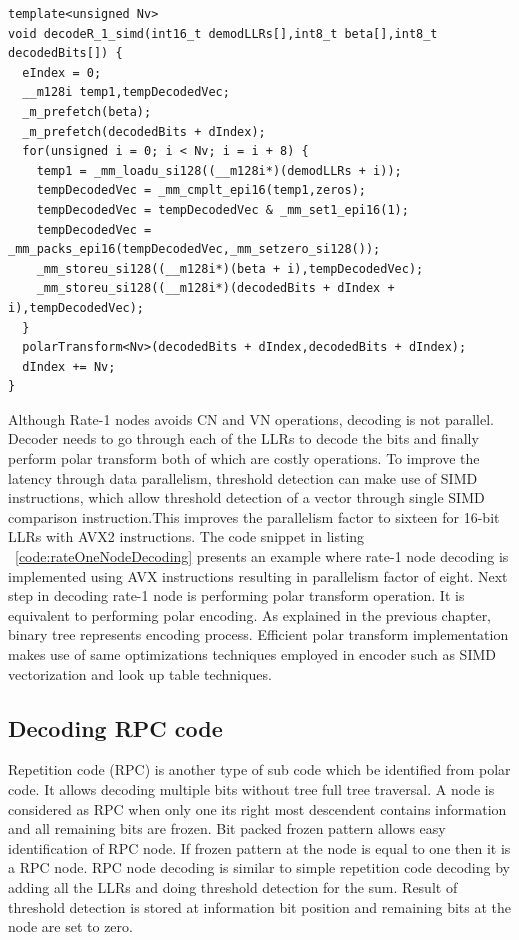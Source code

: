 \begin{code}
	\label{code:rateOneNodeDecoding}
	\begin{verbatim}
template<unsigned Nv>
void decodeR_1_simd(int16_t demodLLRs[],int8_t beta[],int8_t decodedBits[]) {
  eIndex = 0;
  __m128i temp1,tempDecodedVec;
  _m_prefetch(beta);
  _m_prefetch(decodedBits + dIndex);
  for(unsigned i = 0; i < Nv; i = i + 8) {
    temp1 = _mm_loadu_si128((__m128i*)(demodLLRs + i));
    tempDecodedVec = _mm_cmplt_epi16(temp1,zeros);
    tempDecodedVec = tempDecodedVec & _mm_set1_epi16(1);
    tempDecodedVec = _mm_packs_epi16(tempDecodedVec,_mm_setzero_si128());
    _mm_storeu_si128((__m128i*)(beta + i),tempDecodedVec);
    _mm_storeu_si128((__m128i*)(decodedBits + dIndex + i),tempDecodedVec);
  }
  polarTransform<Nv>(decodedBits + dIndex,decodedBits + dIndex);
  dIndex += Nv;
}
\end{verbatim}
\end{code}

Although Rate-1 nodes avoids CN and VN operations, decoding is not parallel. Decoder needs to go through each of the LLRs to decode the bits and finally perform polar transform both of which are costly operations. To improve the latency through data parallelism, threshold detection can make use of SIMD instructions, which allow threshold detection of a vector through single SIMD comparison instruction.This improves the parallelism factor to sixteen for 16-bit LLRs with {AVX2} instructions. The code snippet in listing ~\ref{code:rateOneNodeDecoding} presents an example where rate-1 node decoding is implemented using AVX instructions resulting in parallelism factor of eight. Next step in decoding rate-1 node is performing polar transform operation. It is equivalent to performing polar encoding. As explained in the previous chapter, binary tree represents encoding process. Efficient polar transform implementation makes use of same optimizations techniques employed in encoder such as SIMD vectorization and look up table techniques.

\subsection{Decoding RPC code}
Repetition code (RPC) is another type of sub code which be identified from polar code. It allows decoding multiple bits without tree full tree traversal. A node is considered as RPC when only one its right most descendent contains information and all remaining bits are frozen. Bit packed frozen pattern allows easy identification of RPC node. If frozen pattern at the node is equal to one then it is a RPC node. RPC node decoding is similar to simple repetition code decoding by adding all the LLRs and doing threshold detection for the sum.  Result of threshold detection is stored at information bit position and remaining bits at the node are set to zero.

